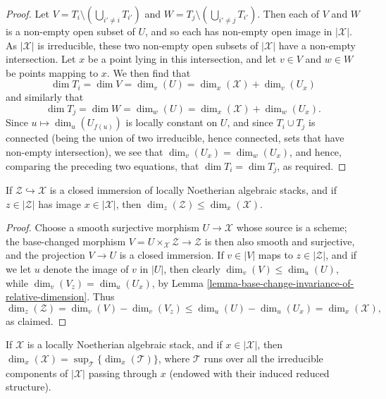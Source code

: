 \begin{proof}
\medskip\noindent
Let $V = T_i \setminus (\bigcup_{i' \neq i} T_{i'})$
and $W = T_j \setminus (\bigcup_{i' \neq j} T_{i'})$.
Then each of $V$ and $W$ is a non-empty open subset of $U$,
and so each has non-empty open image in $|\mathcal{X}|$.  As $|\mathcal{X}|$ is
irreducible,
these two non-empty open subsets of $|\mathcal{X}|$ have a non-empty
intersection.
Let $x$ be a point lying in this intersection, and let $v \in V$ and
$w\in W$ be points mapping to $x$.
We then find that
$$
\dim T_i = \dim V = \dim_v (U) = \dim_x (\mathcal{X}) + \dim_v (U_x)
$$
and similarly that
$$
\dim T_j = \dim W = \dim_w (U) = \dim_x (\mathcal{X}) + \dim_w (U_x).
$$
Since $u \mapsto \dim_u (U_{f(u)})$ is locally constant on $U$,
and since $T_i \cup T_j$ is connected (being the union of two irreducible,
hence connected, sets that have non-empty intersection),
we see that $\dim_v (U_x) = \dim_w(U_x)$,
and hence, comparing the preceding two equations,
that $\dim T_i = \dim T_j$, as required.
\end{proof}

\begin{lemma}
\label{lemma-closed-immersions}
If $\mathcal{Z} \hookrightarrow \mathcal{X}$ is a closed immersion
of locally Noetherian algebraic stacks,
and if $z \in |\mathcal{Z}|$ has image $x \in |\mathcal{X}|$,
then $\dim_z (\mathcal{Z}) \leq \dim_x(\mathcal{X})$.
\end{lemma}

\begin{proof}
Choose a smooth surjective morphism
$U\to \mathcal{X}$ whose source is a scheme;
the base-changed morphism
$V = U\times_{\mathcal{X}} \mathcal{Z} \to \mathcal{Z}$
is then also smooth and surjective, and the projection
$V \to U$ is a closed immersion.
If $v \in |V|$ maps to $z \in |\mathcal{Z}|$, and
if we let $u$ denote the image of $v$ in $|U|$,
then clearly
$\dim_v(V) \leq \dim_u(U)$,
while
$\dim_v (V_z) = \dim_u(U_x)$,
by Lemma \ref{lemma-base-change-invariance-of-relative-dimension}.
Thus
$$
\dim_z(\mathcal{Z})  = \dim_v(V) - \dim_v(V_z)
\leq \dim_u(U) - \dim_u(U_x) = \dim_x(\mathcal{X}),
$$
as claimed.
\end{proof}

\begin{lemma}
\label{lemma-dimension-via-components}
If $\mathcal{X}$ is a locally Noetherian algebraic stack, and if
$x \in |\mathcal{X}|$,
then $\dim_x(\mathcal{X}) = \sup_{\mathcal{T}} \{ \dim_x(\mathcal{T}) \} $,
where $\mathcal{T}$ runs over all the irreducible components
of $|\mathcal{X}|$ passing through $x$ (endowed with their
induced reduced structure).
\end{lemma}

